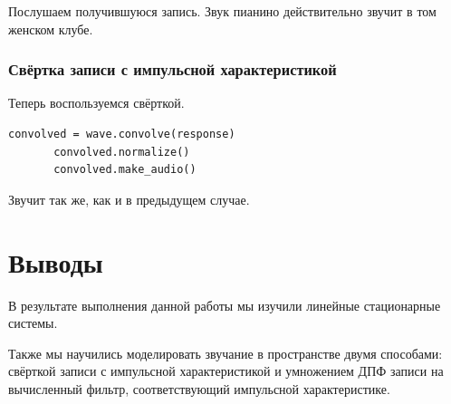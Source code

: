 \documentclass[a4paper,12pt]{report}
\begin{document}
    Послушаем получившуюся запись. Звук пианино действительно звучит в том женском клубе.
\subsection{Свёртка записи с импульсной характеристикой}
    
    Теперь воспользуемся свёрткой.
\begin{lstlisting}[caption=Свёртка]
       convolved = wave.convolve(response)
       convolved.normalize()
       convolved.make_audio()
\end{lstlisting}
    
    Звучит так же, как и в предыдущем случае.       
\chapter{Выводы}
    В результате выполнения данной работы мы изучили линейные стационарные системы.
   
    Также мы научились моделировать звучание в пространстве двумя способами: свёрткой записи с импульсной характеристикой и умножением ДПФ записи на вычисленный фильтр, соответствующий импульсной характеристике.
\end{document}
